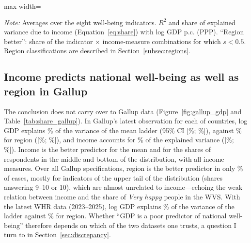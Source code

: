 \documentclass[12pt]{article}
\begin{document}
\begin{table}[htbp]
    \centering
    \begin{adjustbox}{max width=\textwidth}
    
    \end{adjustbox}
    \caption{Income vs.\ region by region classification and without Latin America or Eastern Europe (WVS/EVS).}\label{tab:region_classifications}
    \begin{minipage}{\textwidth}\footnotesize \textit{Note:} Averages over the eight well-being indicators. $R^2$ and share of explained variance due to income (Equation~\eqref{eq:share}) with log GDP p.c. (PPP). ``Region better'': share of the indicator $\times$ income-measure combinations for which $s < 0.5$. Region classifications are described in Section~\ref{subsec:regions}.\end{minipage}
\end{table}

\subsection{Income predicts national well-being as well as region in Gallup}\label{subsec:gallup_results}

The conclusion does not carry over to Gallup data (Figure~\ref{fig:gallup_gdp} and Table~\ref{tab:share_gallup}). In Gallup's latest observation for each of \nGallupCountries countries, log GDP explains \RtwoGallupMeanPPP\% of the variance of the mean ladder (95\% CI [\ciLowGallupRIncome\%; \ciHighGallupRIncome\%]), against \RtwoGallupRegion\% for region ([\ciLowGallupRRegion\%; \ciHighGallupRRegion\%]), and income accounts for \shareIncomeGallupMean\% of the explained variance ([\ciLowGallupShare\%; \ciHighGallupShare\%]). Income is the better predictor for the mean and for the shares of respondents in the middle and bottom of the distribution, with all income measures. Over all Gallup specifications, region is the better predictor in only \shareRegionBetterGallup\% of cases, mostly for indicators of the upper tail of the distribution (shares answering 9--10 or 10), which are almost unrelated to income---echoing the weak relation between income and the share of \textit{Very happy} people in the WVS. With the latest WHR data (2023--2025), log GDP explains \RtwoWHRPPP\% of the variance of the ladder against \RtwoWHRRegion\% for region. Whether ``GDP is a poor predictor of national well-being'' therefore depends on which of the two datasets one trusts, a question I turn to in Section~\ref{sec:discrepancy}.
\end{document}
